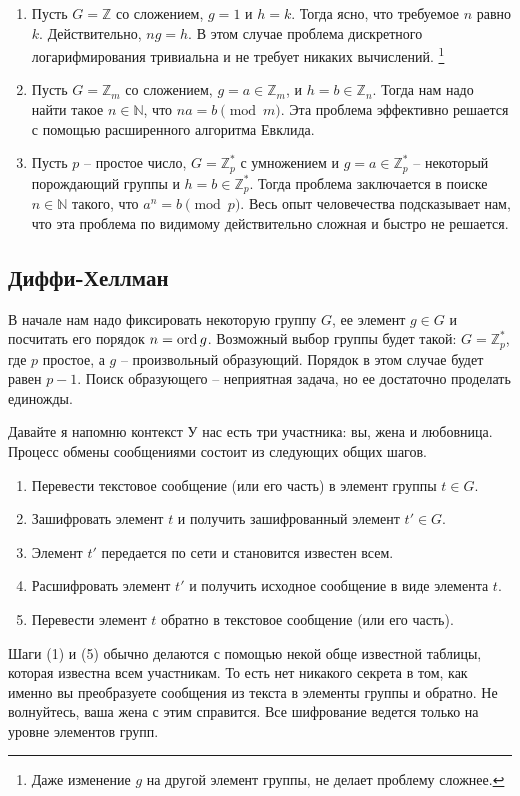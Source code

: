 \begin{examples}
\begin{enumerate}
\item Пусть $G = \mathbb Z$ со сложением, $g = 1$ и $h = k$.
Тогда ясно, что требуемое $n$ равно $k$.
Действительно, $ng = h$.
В этом случае проблема дискретного логарифмирования тривиальна и не требует никаких вычислений.%
\footnote{Даже изменение $g$ на другой элемент группы, не делает проблему сложнее.}

\item Пусть $G = \mathbb Z_m$ со сложением, $g = a\in \mathbb Z_m$, и $h = b\in \mathbb Z_n$.
Тогда нам надо найти такое $n\in\mathbb N$, что $na = b \pmod m$.
Эта проблема эффективно решается с помощью расширенного алгоритма Евклида.

\item Пусть $p$ -- простое число, $G = \mathbb Z_p^*$ с умножением и $g = a\in \mathbb Z_p^*$ -- некоторый порождающий группы и $h = b\in \mathbb Z_p^*$.
Тогда проблема заключается в поиске $n\in \mathbb N$ такого, что $a^n = b \pmod p$.
Весь опыт человечества подсказывает нам, что эта проблема по видимому действительно сложная и быстро не решается.
\end{enumerate}
\end{examples}

\subsection{Диффи-Хеллман}

В начале нам надо фиксировать некоторую группу $G$, ее элемент $g\in G$ и посчитать его порядок $n = \operatorname{ord} g$.
Возможный выбор группы будет такой: $G = \mathbb Z_p^*$, где $p$ простое, а $g$ -- произвольный образующий.
Порядок в этом случае будет равен $p - 1$.
Поиск образующего -- неприятная задача, но ее достаточно проделать единожды.

Давайте я напомню контекст
У нас есть три участника: вы, жена и любовница.
Процесс обмены сообщениями состоит из следующих общих шагов.
\begin{enumerate}
\item Перевести текстовое сообщение (или его часть) в элемент группы $t\in G$.

\item Зашифровать элемент $t$ и получить зашифрованный элемент $t'\in G$.

\item Элемент $t'$ передается по сети и становится известен всем.

\item Расшифровать элемент $t'$ и получить исходное сообщение в виде элемента $t$.

\item Перевести элемент $t$ обратно в текстовое сообщение (или его часть).
\end{enumerate}
Шаги (1) и (5) обычно делаются с помощью некой обще известной таблицы, которая известна всем участникам.
То есть нет никакого секрета в том, как именно вы преобразуете сообщения из текста в элементы группы и обратно.
Не волнуйтесь, ваша жена с этим справится.
Все шифрование ведется только на уровне элементов групп.


